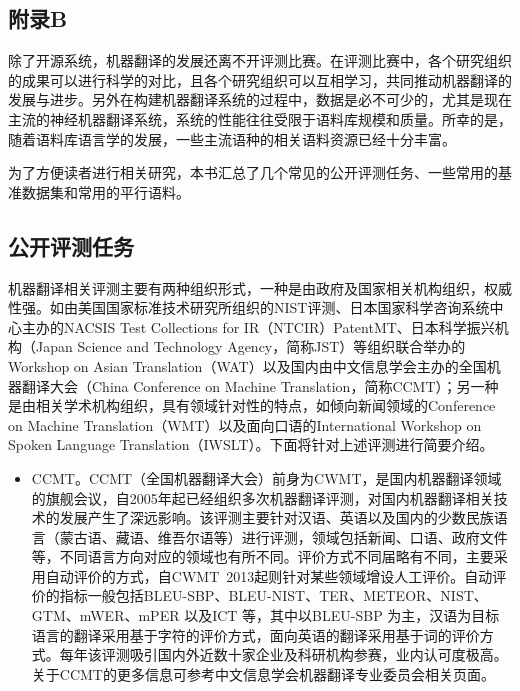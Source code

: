 \begin{appendices}
\chapter{附录B}
\label{appendix-B}
\parinterval 除了开源系统，机器翻译的发展还离不开评测比赛。在评测比赛中，各个研究组织的成果可以进行科学的对比，且各个研究组织可以互相学习，共同推动机器翻译的发展与进步。另外在构建机器翻译系统的过程中，数据是必不可少的，尤其是现在主流的神经机器翻译系统，系统的性能往往受限于语料库规模和质量。所幸的是，随着语料库语言学的发展，一些主流语种的相关语料资源已经十分丰富。

\parinterval 为了方便读者进行相关研究，本书汇总了几个常见的公开评测任务、一些常用的基准数据集和常用的平行语料。

\section{公开评测任务}
\parinterval 机器翻译相关评测主要有两种组织形式，一种是由政府及国家相关机构组织，权威性强。如由美国国家标准技术研究所组织的NIST评测、日本国家科学咨询系统中心主办的NACSIS Test Collections for IR（NTCIR）PatentMT、日本科学振兴机构（Japan Science and Technology Agency，简称JST）等组织联合举办的Workshop on Asian Translation（WAT）以及国内由中文信息学会主办的全国机器翻译大会（China Conference on Machine Translation，简称CCMT）；另一种是由相关学术机构组织，具有领域针对性的特点，如倾向新闻领域的Conference on Machine Translation（WMT）以及面向口语的International Workshop on Spoken Language Translation（IWSLT）。下面将针对上述评测进行简要介绍。

\begin{itemize}
\vspace{0.5em}
\item CCMT。CCMT（全国机器翻译大会）前身为CWMT，是国内机器翻译领域的旗舰会议，自2005年起已经组织多次机器翻译评测，对国内机器翻译相关技术的发展产生了深远影响。该评测主要针对汉语、英语以及国内的少数民族语言（蒙古语、藏语、维吾尔语等）进行评测，领域包括新闻、口语、政府文件等，不同语言方向对应的领域也有所不同。评价方式不同届略有不同，主要采用自动评价的方式，自CWMT\ 2013起则针对某些领域增设人工评价。自动评价的指标一般包括BLEU-SBP、BLEU-NIST、TER、METEOR、NIST、GTM、mWER、mPER 以及ICT 等，其中以BLEU-SBP 为主，汉语为目标语言的翻译采用基于字符的评价方式，面向英语的翻译采用基于词的评价方式。每年该评测吸引国内外近数十家企业及科研机构参赛，业内认可度极高。关于CCMT的更多信息可参考中文信息学会机器翻译专业委员会相关页面。


\end{itemize}
\end{appendices}
